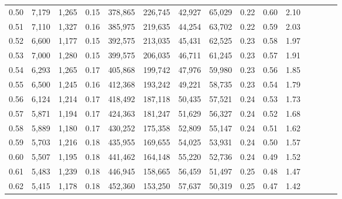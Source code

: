 \begin{tabular}{rrrcrrrrrrrrrrr}
0.50 &   7,179 &   1,265 &                                       0.15 &  378,865 &  226,745 &   42,927 &   65,029 &  0.22 &  0.60 &                         2.10 \\
0.51 &   7,110 &   1,327 &                                       0.16 &  385,975 &  219,635 &   44,254 &   63,702 &  0.22 &  0.59 &                         2.03 \\
0.52 &   6,600 &   1,177 &                                       0.15 &  392,575 &  213,035 &   45,431 &   62,525 &  0.23 &  0.58 &                         1.97 \\
0.53 &   7,000 &   1,280 &                                       0.15 &  399,575 &  206,035 &   46,711 &   61,245 &  0.23 &  0.57 &                         1.91 \\
0.54 &   6,293 &   1,265 &                                       0.17 &  405,868 &  199,742 &   47,976 &   59,980 &  0.23 &  0.56 &                         1.85 \\
0.55 &   6,500 &   1,245 &                                       0.16 &  412,368 &  193,242 &   49,221 &   58,735 &  0.23 &  0.54 &                         1.79 \\
0.56 &   6,124 &   1,214 &                                       0.17 &  418,492 &  187,118 &   50,435 &   57,521 &  0.24 &  0.53 &                         1.73 \\
0.57 &   5,871 &   1,194 &                                       0.17 &  424,363 &  181,247 &   51,629 &   56,327 &  0.24 &  0.52 &                         1.68 \\
0.58 &   5,889 &   1,180 &                                       0.17 &  430,252 &  175,358 &   52,809 &   55,147 &  0.24 &  0.51 &                         1.62 \\
0.59 &   5,703 &   1,216 &                                       0.18 &  435,955 &  169,655 &   54,025 &   53,931 &  0.24 &  0.50 &                         1.57 \\
0.60 &   5,507 &   1,195 &                                       0.18 &  441,462 &  164,148 &   55,220 &   52,736 &  0.24 &  0.49 &                         1.52 \\
0.61 &   5,483 &   1,239 &                                       0.18 &  446,945 &  158,665 &   56,459 &   51,497 &  0.25 &  0.48 &                         1.47 \\
0.62 &   5,415 &   1,178 &                                       0.18 &  452,360 &  153,250 &   57,637 &   50,319 &  0.25 &  0.47 &                         1.42 \\

\end{tabular}
